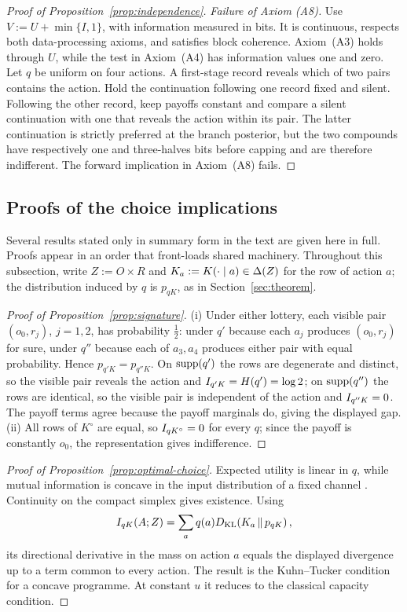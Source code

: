 \begin{proof}[Proof of Proposition~\ref{prop:independence}]
\emph{Failure of Axiom \textup{(A8)}.}
Use $V:=U+\min\{I,1\}$, with information measured in bits.  It is continuous, respects both data-processing axioms,
and satisfies block coherence.  Axiom~\textup{(A3)} holds through $U$, while the test in Axiom~\textup{(A4)}
has information values one and zero.  Let $q$ be uniform on four actions.  A first-stage record reveals which of two pairs
contains the action.  Hold the continuation following one record fixed and silent.  Following the other record,
keep payoffs constant and compare a silent continuation with one that reveals the action within its pair.  The latter continuation is strictly
preferred at the branch posterior, but the two compounds have respectively one and three-halves bits before capping
and are therefore indifferent.  The forward implication in Axiom~\textup{(A8)} fails.
\end{proof}

\subsection{Proofs of the choice implications}\label{app:choice-proofs}

Several results stated only in summary form in the text are given here in full.  Proofs appear in an order that
front-loads shared machinery.  Throughout this subsection, write
$Z:=O\times R$ and $K_a:=K(\cdot\mid a)\in\Delta(Z)$ for the row of action $a$; the distribution induced by $q$ is
$p_{qK}$, as in Section~\ref{sec:theorem}.

\begin{proof}[Proof of Proposition~\ref{prop:signature}]
(i) Under either lottery, each visible pair $(o_0,r_j)$, $j=1,2$, has probability $\tfrac12$: under $q'$ because
each $a_j$ produces $(o_0,r_j)$ for sure, under $q''$ because each of $a_3,a_4$ produces either pair with equal
probability.  Hence $p_{q'K}=p_{q''K}$.  On $\operatorname{supp}(q')$ the rows are degenerate and distinct, so the visible pair
reveals the action and $I_{q'K}=H(q')=\log2$; on $\operatorname{supp}(q'')$ the rows are identical, so the visible pair is
independent of the action and $I_{q''K}=0$.  The payoff terms agree because the payoff marginals do, giving the
displayed gap.
(ii) All rows of $K^\circ$ are equal, so $I_{qK^\circ}=0$ for every $q$; since the payoff is constantly $o_0$,
the representation gives indifference.
\end{proof}

\begin{proof}[Proof of Proposition~\ref{prop:optimal-choice}]
Expected utility is linear in $q$, while mutual information is concave in the input distribution of a fixed channel
\cite{CoverThomas2006}.  Continuity on the compact simplex gives existence.  Using
\[
 I_{qK}(A;Z)=\sum_aq(a)D_{\mathrm{KL}}\!\left(K_a\,\middle\|\,p_{qK}\right),
\]
its directional derivative in the mass on action $a$ equals the displayed divergence up to a term common to every
action.  The result is the Kuhn--Tucker condition for a concave programme.  At constant $u$ it reduces to the classical
capacity condition.
\end{proof}


